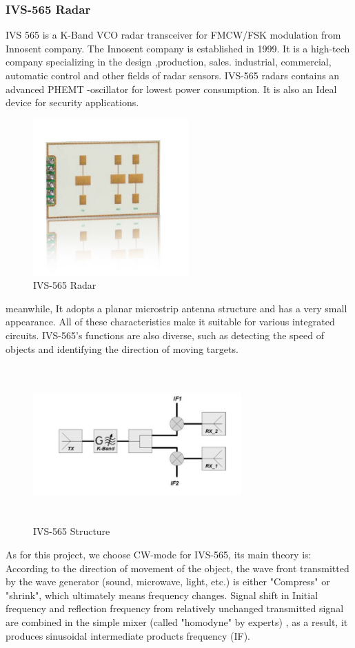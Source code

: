 \subsubsection{IVS-565 Radar}
IVS 565 is a K-Band VCO radar transceiver for FMCW/FSK modulation from Innosent company. 
The Innosent company is established in 1999. It is a high-tech company specializing in the design ,production, sales. industrial, commercial, automatic control and other fields of radar sensors.
IVS-565 radars contains an advanced PHEMT -oscillator for lowest power consumption. It is also an Ideal device for security applications. 
\begin{figure}[H]
    \centering
    \includegraphics[width=6cm,height=6cm]{figure/IVS-565Radar.jpg}
    \caption{IVS-565 Radar}
    \label{png_IVS565}
\end{figure}
meanwhile, It adopts a planar microstrip antenna structure and has a very small appearance. All of these characteristics make it suitable for various integrated circuits. IVS-565’s functions are also diverse, such as detecting the speed of objects and identifying the direction of moving targets.
\begin{figure}[H]
    \centering
    \includegraphics[width=8cm,height=6cm]{figure/IVS-565Structure.jpg}
    \caption{IVS-565 Structure}
\end{figure}
As for this project, we choose CW-mode for IVS-565, its main theory is: According to the direction of movement of the object, the wave front transmitted by the wave generator (sound, microwave, light, etc.) is either "Compress" or "shrink", which ultimately means frequency changes. Signal shift in Initial frequency and reflection frequency from relatively unchanged transmitted signal are combined in the simple mixer (called "homodyne" by experts) , as a result, it produces sinusoidal intermediate products frequency (IF).
